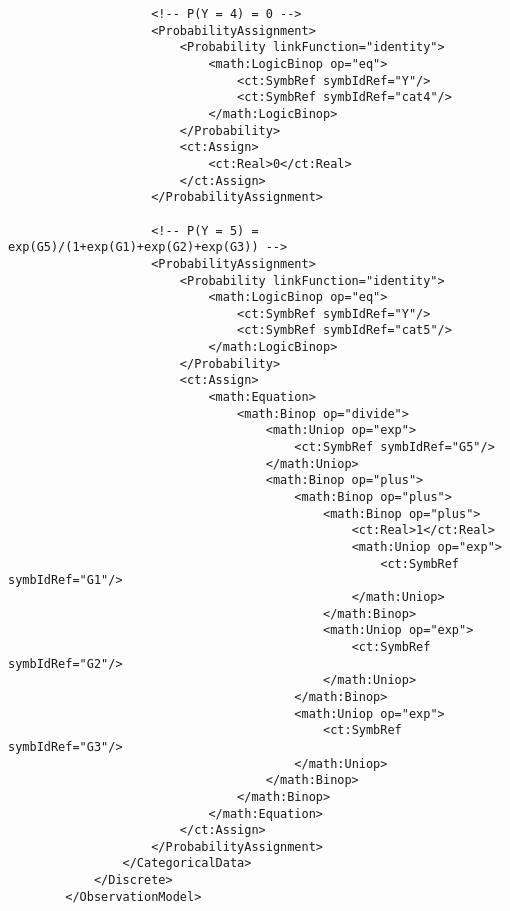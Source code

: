 \begin{lstlisting}
                    <!-- P(Y = 4) = 0 --> 
                    <ProbabilityAssignment>
                        <Probability linkFunction="identity">
                            <math:LogicBinop op="eq">
                                <ct:SymbRef symbIdRef="Y"/>
                                <ct:SymbRef symbIdRef="cat4"/>
                            </math:LogicBinop>
                        </Probability>
                        <ct:Assign>
                            <ct:Real>0</ct:Real>
                        </ct:Assign>
                    </ProbabilityAssignment>
                    
                    <!-- P(Y = 5) = exp(G5)/(1+exp(G1)+exp(G2)+exp(G3)) --> 
                    <ProbabilityAssignment>
                        <Probability linkFunction="identity">
                            <math:LogicBinop op="eq">
                                <ct:SymbRef symbIdRef="Y"/>
                                <ct:SymbRef symbIdRef="cat5"/>
                            </math:LogicBinop>
                        </Probability>
                        <ct:Assign>
                            <math:Equation>
                                <math:Binop op="divide">
                                    <math:Uniop op="exp">
                                        <ct:SymbRef symbIdRef="G5"/>
                                    </math:Uniop>
                                    <math:Binop op="plus">
                                        <math:Binop op="plus">
                                            <math:Binop op="plus">
                                                <ct:Real>1</ct:Real>
                                                <math:Uniop op="exp">
                                                    <ct:SymbRef symbIdRef="G1"/>
                                                </math:Uniop>
                                            </math:Binop>
                                            <math:Uniop op="exp">
                                                <ct:SymbRef symbIdRef="G2"/>
                                            </math:Uniop>
                                        </math:Binop>
                                        <math:Uniop op="exp">
                                            <ct:SymbRef symbIdRef="G3"/>
                                        </math:Uniop>
                                    </math:Binop>
                                </math:Binop>
                            </math:Equation>
                        </ct:Assign>
                    </ProbabilityAssignment>
                </CategoricalData>
            </Discrete>
        </ObservationModel>
\end{lstlisting}


